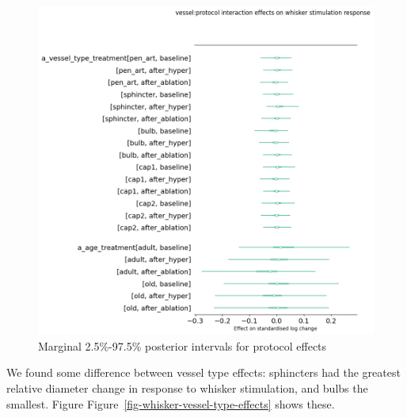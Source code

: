 \documentclass[
  letterpaper,
  DIV=11,
  numbers=noendperiod,
  oneside]{scrartcl}
\theoremstyle{plain}
\theoremstyle{remark}
\begin{document}
\begin{figure}

\begin{minipage}{\linewidth}

\includegraphics{../plots/whisker-protocol-effects.png}

\end{minipage}%

\caption{\label{fig-whisker-small-effects}Marginal 2.5\%-97.5\%
posterior intervals for protocol effects}

\end{figure}%

We found some difference between vessel type effects: sphincters had the
greatest relative diameter change in response to whisker stimulation,
and bulbs the smallest. Figure
Figure~\ref{fig-whisker-vessel-type-effects} shows these.
\end{document}

